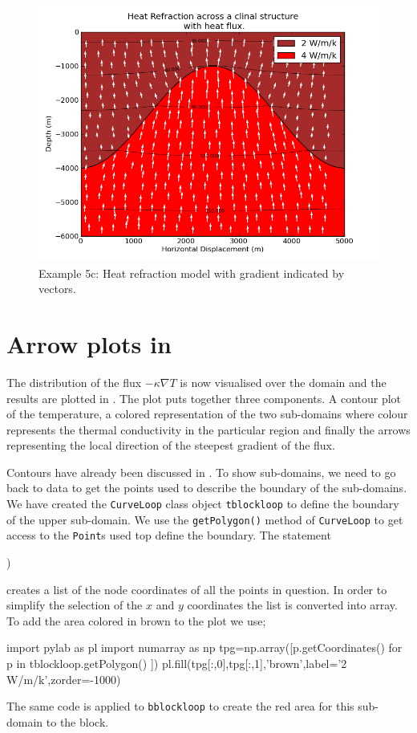 \begin{figure}[ht]
\centerline{\includegraphics[width=5.in]{figures/heatrefractionflux}}
\caption{Example 5c: Heat refraction model with gradient indicated by vectors.}
\label{fig:hr001qumodel}
\end{figure}

\section{Arrow plots in \mpl}
The distribution of the flux $-\kappa \nabla T$ is now visualised over the domain 
and the results are plotted in . 
The plot puts together three components. A contour plot of the temperature,
a colored representation of the two sub-domains where colour represents the thermal conductivity 
in the particular region and finally the arrows representing the local direction of the steepest gradient of the flux.

Contours have already been discussed in . To show sub-domains, 
we need to go back to \pycad data to get the points used to describe the boundary of the 
sub-domains. We have created the \verb|CurveLoop| class object 
\verb|tblockloop| to define the boundary of the upper sub-domain. 
We use the \verb|getPolygon()| method of \verb|CurveLoop| to get
access to the \verb|Point|s used top define the boundary. The statement
\begin{python}
)
\end{python}
creates a list of the node coordinates of all the points in question. In order 
to simplify the selection of the $x$ and $y$ coordinates the list is converted 
into \modnumpy array. To add the area colored in brown to the plot we use; 
\begin{python}
import pylab as pl
import numarray as np
tpg=np.array([p.getCoordinates() for p in tblockloop.getPolygon() ])
pl.fill(tpg[:,0],tpg[:,1],'brown',label='2 W/m/k',zorder=-1000)
\end{python}
The same code is applied to \verb|bblockloop| to create the red area for this sub-domain to the block.

